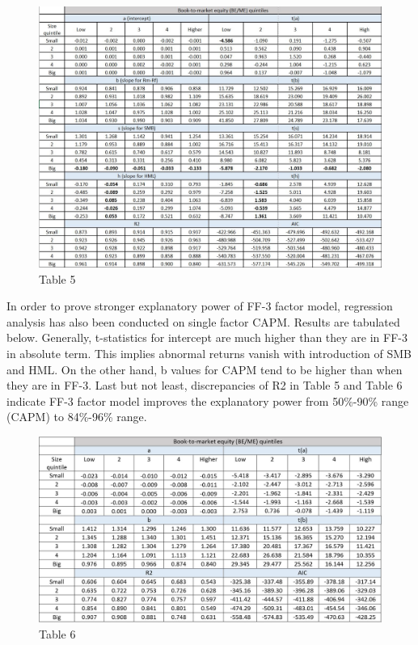 \documentclass[12pt]{article}
\begin{document}
\begin{figure}[h]
	\centering
	\includegraphics[width=1\linewidth]{5.JPG}
	\caption*{Table 5}
	\label{fig:label}
\end{figure}


\noindent In order to prove stronger explanatory power of FF-3 factor model, regression analysis has also been conducted on single factor CAPM. Results are tabulated below. Generally, t-statistics for intercept are much higher than they are in FF-3 in absolute term. This implies abnormal returns vanish with introduction of SMB and HML. On the other hand, b values for CAPM tend to be higher than when they are in FF-3. Last but not least, discrepancies of R2 in Table 5 and Table 6 indicate FF-3 factor model improves the explanatory power from 50\%-90\% range (CAPM) to 84\%-96\% range.



\begin{figure}[h]
	\centering
	\includegraphics[width=1\linewidth]{6.JPG}
	\caption*{Table 6}
	\label{fig:label}
\end{figure}
\end{document}
